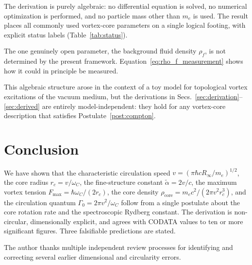 \documentclass[aps,pra,preprint,longbibliography,nofootinbib]{revtex4-2}
\newcommand{\vc}{v}              %
\newcommand{\rc}{r_c}            %
\newcommand{\omC}{\omega_C}      %
\newcommand{\Rinf}{R_\infty}     %
\newcommand{\Fmax}{F_{\max}}     %
\newcommand{\rhocore}{\rho_{\mathrm{core}}} %
\newcommand{\Gz}{\Gamma_0}       %
\begin{document}
The derivation is purely algebraic: no differential equation is solved,
no numerical optimization is performed, and no particle mass other than
$m_e$ is used.
The result places all commonly used vortex-core parameters on a single
logical footing, with explicit status labels (Table~\ref{tab:status}).

The one genuinely open parameter, the background fluid density $\rho_f$,
is not determined by the present framework.
Equation~\eqref{eq:rho_f_measurement} shows how it could in principle
be measured.

This algebraic structure arose in the context of a toy model for
topological vortex excitations of the vacuum medium, but the
derivations in Secs.~\ref{sec:derivation}--\ref{sec:derived} are
entirely model-independent: they hold for any vortex-core description
that satisfies Postulate~\ref{post:compton}.

\section{Conclusion}
\label{sec:conclusion}

We have shown that the characteristic circulation speed
$\vc = (\pi\hbar c\Rinf/m_e)^{1/2}$,
the core radius $\rc = \vc/\omC$,
the fine-structure constant $\tilde\alpha = 2\vc/c$,
the maximum vortex tension $\Fmax = \hbar\omC/(2\rc)$,
the core density $\rhocore = m_ec^2/(2\pi\vc^2\rc^3)$,
and the circulation quantum $\Gz = 2\pi\vc^2/\omC$
follow from a single postulate about the core rotation rate
and the spectroscopic Rydberg constant.
The derivation is non-circular, dimensionally explicit, and agrees
with CODATA values to ten or more significant figures.
Three falsifiable predictions are stated.

\begin{acknowledgments}
The author thanks multiple independent review processes for
identifying and correcting several earlier dimensional and
circularity errors.
\end{acknowledgments}
\end{document}
